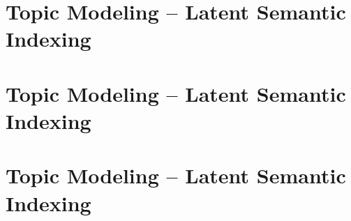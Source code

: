\documentclass{beamer}
\begin{document}

\section{Topic Modeling -- Latent Semantic Indexing}
{
\begin{frame}
\textcolor{black} {
\hfill \Huge \insertsection}
\end{frame}
}


\section{Topic Modeling -- Latent Semantic Indexing}
{
\begin{frame}
\textcolor{black} {
\hfill \Huge \insertsection}
\end{frame}
}


\section{Topic Modeling -- Latent Semantic Indexing}
{
\begin{frame}
\textcolor{black} {
\hfill \Huge \insertsection}
\end{frame}
}
\end{document}
